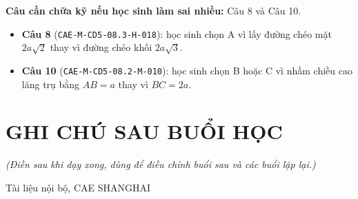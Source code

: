 \documentclass[11pt, a4paper]{article}
\begin{document}
\textbf{Câu cần chữa kỹ nếu học sinh làm sai nhiều:} Câu 8 và Câu 10.

\begin{itemize}[leftmargin=1.4em, itemsep=2pt]
\item \textbf{Câu 8} (\texttt{CAE-M-CD5-08.3-H-018}): học sinh chọn A vì lấy đường chéo mặt $2a\sqrt{2}$ thay vì đường chéo khối $2a\sqrt{3}$.
\item \textbf{Câu 10} (\texttt{CAE-M-CD5-08.2-M-010}): học sinh chọn B hoặc C vì nhầm chiều cao lăng trụ bằng $AB = a$ thay vì $BC = 2a$.
\end{itemize}

\section{GHI CHÚ SAU BUỔI HỌC}

\emph{(Điền sau khi dạy xong, dùng để điều chỉnh buổi sau và các buổi lặp lại.)}

\vspace{0.8cm}
\begin{center}
{\footnotesize\color{cae_blue} Tài liệu nội bộ, CAE SHANGHAI}
\end{center}
\end{document}
